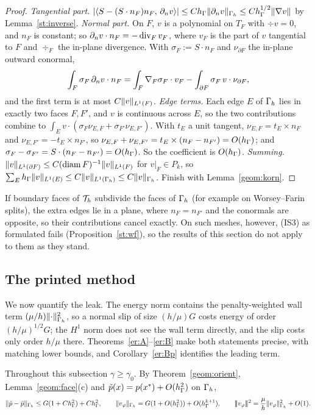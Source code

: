 \begin{proof}
\emph{Tangential part.} $|\langle S-(S\cdot n_F)n_F,\, \partial_n v\rangle|\le Ch_\Gamma\lVert \partial_n v\rVert_{\Gamma_h}\le Ch_\Gamma^{1/2}\lVert \nabla v\rVert$ by Lemma~\ref{st:inverse}.
\emph{Normal part.} On $F$, $v$ is a polynomial on $T_F$ with $\div v=0$, and $n_F$ is constant; so $\partial_n v\cdot n_F=-\operatorname{div}_Fv_F$, where $v_F$ is the part of $v$ tangential to $F$ and $\div_F$ the in-plane divergence. With $\sigma_F:=S\cdot n_F$ and $\nu_{\partial F}$ the in-plane outward conormal,
\[
\int_F\sigma_F\,\partial_n v\cdot n_F=\int_F\nabla_F\sigma_F\cdot v_F-\int_{\partial F}\sigma_F\,v\cdot\nu_{\partial F},
\]
and the first term is at most $C\lVert v\rVert_{L^1(F)}$.
\emph{Edge terms.} Each edge $E$ of $\Gamma_h$ lies in exactly two faces $F,F'$, and $v$ is continuous across $E$, so the two contributions combine to $\int_Ev\cdot(\sigma_F\nu_{E,F}+\sigma_{F'}\nu_{E,F'})$. With $t_E$ a unit tangent, $\nu_{E,F}=t_E\times n_F$ and $\nu_{E,F'}=-t_E\times n_{F'}$, so $\nu_{E,F}+\nu_{E,F'}=t_E\times(n_F-n_{F'})=O(h_\Gamma)$; and $\sigma_F-\sigma_{F'}=S\cdot(n_F-n_{F'})=O(h_\Gamma)$. So the coefficient is $O(h_\Gamma)$.
\emph{Summing.} $\lVert v\rVert_{L^1(\partial F)}\le C(\operatorname{diam} F)^{-1}\lVert v\rVert_{L^1(F)}$ for $v|_F\in P_k$, so $\sum_Eh_\Gamma\lVert v\rVert_{L^1(E)}\le C\lVert v\rVert_{L^1(\Gamma_h)}\le C\lVert v\rVert_{\Gamma_h}$. Finish with Lemma~\ref{geom:korn}.
\end{proof}

If boundary faces of $\mathcal T_h$ subdivide the faces of $\Gamma_h$ (for example on Worsey--Farin splits), the extra edges lie in a plane, where $n_F=n_{F'}$ and the conormals are opposite, so their contributions cancel exactly. On such meshes, however, (IS3) as formulated fails (Proposition~\ref{st:wf}), so the results of this section do not apply to them as they stand.

\subsection{The printed method}
We now quantify the leak. The energy norm contains the penalty-weighted wall term $(\mu/h)\lVert \cdot\rVert_{\Gamma_h}^2$, so a normal slip of size $(h/\mu)G$ costs energy of order $(h/\mu)^{1/2}G$; the $H^1$ norm does not see the wall term directly, and the slip costs only order $h/\mu$ there. Theorems~\ref{er:A}--\ref{er:B} make both statements precise, with matching lower bounds, and Corollary~\ref{er:Bp} identifies the leading term.

Throughout this subsection $\gamma\ge\gamma_0$. By Theorem~\ref{geom:orient}, Lemma~\ref{geom:face}(c) and $\tilde p(x)=p(x^\ast)+O(h_\Gamma^2)$ on $\Gamma_h$,
\begin{equation}\label{er:riemann}
\lVert \tilde p-\bar p\rVert_{\Gamma_h}\le G(1+Ch_\Gamma^2)+Ch_\Gamma^2,\qquad \lVert v_\varphi\rVert_{\Gamma_h}=G(1+O(h_\Gamma^2))+O(h_\Gamma^{k+1}),\qquad |\!|\!|v_\varphi|\!|\!|^2=\frac\mu h\lVert v_\varphi\rVert^2_{\Gamma_h}+O(1).
\end{equation}

